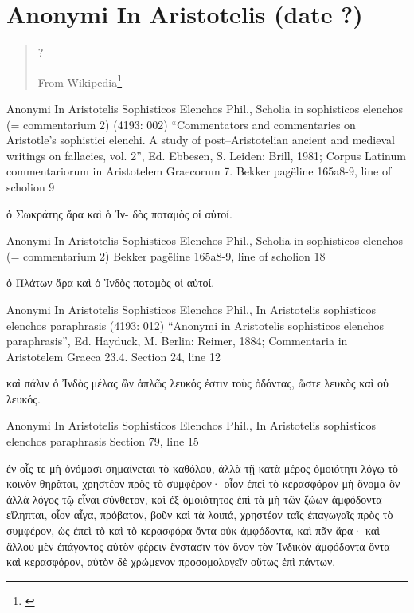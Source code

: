 \documentclass[12pt,letterpaper,twoside,final]{memoir}
\begin{document}
\section{Anonymi In Aristotelis (date ?)}
\blockquote[From Wikipedia\footnote{\url{}}]{?}
\begin{greek}

Anonymi In Aristotelis Sophisticos Elenchos Phil., Scholia in sophisticos elenchos (= commentarium 2) (4193: 002)
“Commentators and commentaries on Aristotle's sophistici elenchi. A study of post–Aristotelian ancient and medieval writings on fallacies, vol. 2”, Ed. Ebbesen, S.
Leiden: Brill, 1981; Corpus Latinum commentariorum in Aristotelem Graecorum 7.
Bekker pagëline 165a8-9, line of scholion 9

                              ὁ Σωκράτης ἄρα καὶ ὁ Ἰν-
δὸς ποταμὸς οἱ αὐτοί. 



Anonymi In Aristotelis Sophisticos Elenchos Phil., Scholia in sophisticos elenchos (= commentarium 2) 
Bekker pagëline 165a8-9, line of scholion 18

            ὁ Πλάτων ἄρα καὶ ὁ Ἰνδὸς ποταμὸς οἱ αὐτοί. 



Anonymi In Aristotelis Sophisticos Elenchos Phil., In Aristotelis sophisticos elenchos paraphrasis (4193: 012)
“Anonymi in Aristotelis sophisticos elenchos paraphrasis”, Ed. Hayduck, M.
Berlin: Reimer, 1884; Commentaria in Aristotelem Graeca 23.4.
Section 24, line 12

                                       καὶ πάλιν ὁ Ἰνδὸς μέλας ὢν ἁπλῶς λευκός 
ἐστιν τοὺς ὀδόντας, ὥστε λευκὸς καὶ οὐ λευκός. 



Anonymi In Aristotelis Sophisticos Elenchos Phil., In Aristotelis sophisticos elenchos paraphrasis 
Section 79, line 15

                                                                               ἐν οἷς 
τε μὴ ὀνόμασι σημαίνεται τὸ καθόλου, ἀλλὰ τῇ κατὰ μέρος ὁμοιότητι λόγῳ 
τὸ κοινὸν θηρᾶται, χρηστέον πρὸς τὸ συμφέρον· οἷον ἐπεὶ τὸ κερασφόρον 
μὴ ὄνομα ὂν ἀλλὰ λόγος τῷ εἶναι σύνθετον, καὶ ἐξ ὁμοιότητος ἐπὶ τὰ μὴ 
τῶν ζώων ἀμφόδοντα εἴληπται, οἷον αἶγα, πρόβατον, βοῦν καὶ τὰ λοιπά, 
χρηστέον ταῖς ἐπαγωγαῖς πρὸς τὸ συμφέρον, ὡς ἐπεὶ τὸ καὶ τὸ κερασφόρα 
ὄντα οὐκ ἀμφόδοντα, καὶ πᾶν ἄρα· καὶ ἄλλου μὲν ἐπάγοντος αὐτὸν φέρειν 
ἔνστασιν τὸν ὄνον τὸν Ἰνδικὸν ἀμφόδοντα ὄντα καὶ κερασφόρον, αὐτὸν δὲ 
χρώμενον προσομολογεῖν οὕτως ἐπὶ πάντων. 

\end{greek}
\end{document}
